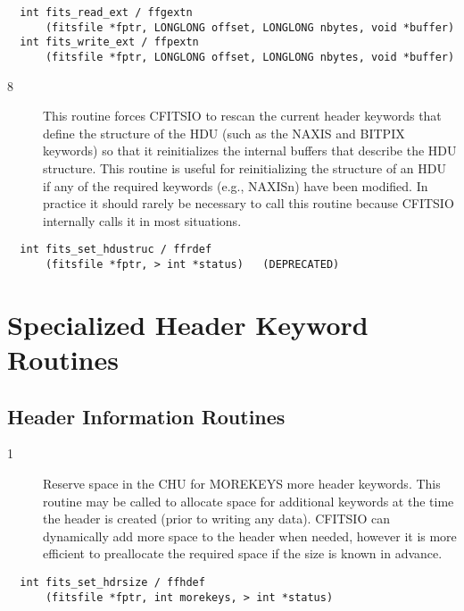 \documentclass[11pt]{book}
\begin{document}
\begin{verbatim}
  int fits_read_ext / ffgextn
      (fitsfile *fptr, LONGLONG offset, LONGLONG nbytes, void *buffer)
  int fits_write_ext / ffpextn
      (fitsfile *fptr, LONGLONG offset, LONGLONG nbytes, void *buffer)
\end{verbatim}

\begin{description}
\item[8 ] This routine forces CFITSIO to rescan the current header keywords that
    define the structure of the HDU (such as the NAXIS and BITPIX
    keywords) so that it reinitializes the internal buffers that
    describe the HDU structure.  This routine is useful for
    reinitializing the structure of an HDU if any of the required
    keywords (e.g., NAXISn) have been modified.  In practice it should
    rarely be necessary to call this routine because CFITSIO
   internally calls it in most situations. \label{ffrdef}
\end{description}

\begin{verbatim}
  int fits_set_hdustruc / ffrdef
      (fitsfile *fptr, > int *status)   (DEPRECATED)
\end{verbatim}

\section{Specialized Header Keyword Routines}


\subsection{Header Information Routines}


\begin{description}
\item[1 ] Reserve space in the CHU for MOREKEYS more header keywords.
    This routine may be called to allocate space for additional keywords
    at the time the header is created (prior to writing any data).
    CFITSIO can dynamically add more space to the header when needed,
    however it is more efficient to preallocate the required space
   if the size is known in advance. \label{ffhdef}
\end{description}

\begin{verbatim}
  int fits_set_hdrsize / ffhdef
      (fitsfile *fptr, int morekeys, > int *status)
\end{verbatim}
\end{document}
